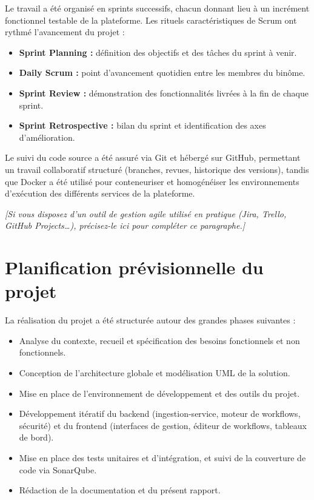 \documentclass[12pt,a4paper]{report}
\newcommand{\placeholder}[1]{\par\smallskip\noindent\textcolor{placeholderred}{\itshape [#1]}\par\smallskip}
\begin{document}
Le travail a été organisé en sprints successifs, chacun donnant lieu à un incrément fonctionnel testable de la plateforme. Les rituels caractéristiques de Scrum ont rythmé l'avancement du projet :

\begin{itemize}
  \item \textbf{Sprint Planning :} définition des objectifs et des tâches du sprint à venir.
  \item \textbf{Daily Scrum :} point d'avancement quotidien entre les membres du binôme.
  \item \textbf{Sprint Review :} démonstration des fonctionnalités livrées à la fin de chaque sprint.
  \item \textbf{Sprint Retrospective :} bilan du sprint et identification des axes d'amélioration.
\end{itemize}

Le suivi du code source a été assuré via Git et hébergé sur GitHub, permettant un travail collaboratif structuré (branches, revues, historique des versions), tandis que Docker a été utilisé pour conteneuriser et homogénéiser les environnements d'exécution des différents services de la plateforme.

\placeholder{Si vous disposez d'un outil de gestion agile utilisé en pratique (Jira, Trello, GitHub Projects…), précisez-le ici pour compléter ce paragraphe.}

\section{Planification prévisionnelle du projet}

La réalisation du projet a été structurée autour des grandes phases suivantes :

\begin{itemize}
  \item Analyse du contexte, recueil et spécification des besoins fonctionnels et non fonctionnels.
  \item Conception de l'architecture globale et modélisation UML de la solution.
  \item Mise en place de l'environnement de développement et des outils du projet.
  \item Développement itératif du backend (ingestion-service, moteur de workflows, sécurité) et du frontend (interfaces de gestion, éditeur de workflows, tableaux de bord).
  \item Mise en place des tests unitaires et d'intégration, et suivi de la couverture de code via SonarQube.
  \item Rédaction de la documentation et du présent rapport.
\end{itemize}
\end{document}
